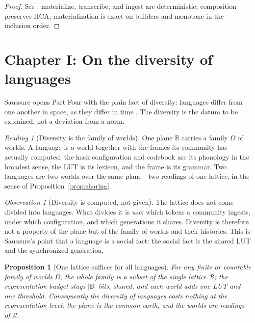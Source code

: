 \documentclass[11pt,a4paper]{article}
\newtheorem{proposition}[principle]{Proposition}
\theoremstyle{remark}
\newtheorem{observation}[principle]{Observation}
\newtheorem{reading}[principle]{Reading}
\newcommand{\Plane}{\ensuremath{\mathbb{B}}}            %
\newcommand{\Lat}{\ensuremath{\mathcal{B}}}              %
\newcommand{\Wset}{\ensuremath{\Omega}}                  %
\begin{document}
\begin{proof}
See \cite{companion2026}: materialize, transcribe, and ingest are
deterministic; composition preserves IICA; materialization is exact on
builders and monotone in the inclusion order.
\end{proof}

\section{Chapter I: On the diversity of languages}
\label{sec:ch1}

Saussure opens Part Four with the plain fact of diversity: languages differ
from one another in space, as they differ in time \cite[Part IV,
ch.~I]{harris1983}. The diversity is the datum to be explained, not a
deviation from a norm.

\begin{reading}[Diversity is the family of worlds]
\label{read:diversity}
One plane $\Plane$ carries a family $\Wset$ of worlds. A language is a world
together with the frames its community has actually computed: the hash
configuration and codebook are its phonology in the broadest sense, the LUT
is its lexicon, and the frame is its grammar. Two languages are two worlds
over the same plane---two readings of one lattice, in the sense of
Proposition~\ref{prop:sharing}.
\end{reading}

\begin{observation}[Diversity is computed, not given]
\label{obs:diversity}
The lattice does not come divided into languages. What divides it is
\emph{use}: which tokens a community ingests, under which configuration, and
which generations it shares. Diversity is therefore not a property of the
plane but of the family of worlds and their histories. This is Saussure's
point that a language is a social fact: the social fact is the shared LUT and
the synchronized generation.
\end{observation}

\begin{proposition}[One lattice suffices for all languages]
\label{prop:one-lattice}
For any finite or countable family of worlds $\Wset$, the whole family is a
subset of the single lattice $\Lat$; the representation budget stays
$|\Plane|$ bits, shared, and each world adds one LUT and one threshold.
Consequently the diversity of languages costs nothing at the representation
level: the plane is the common earth, and the worlds are readings of it.
\end{proposition}
\end{document}
